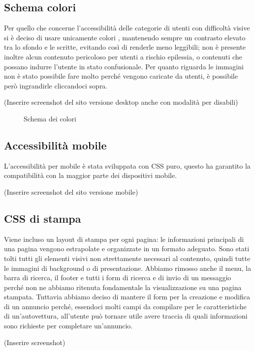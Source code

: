 	\subsection{Schema colori}
	\par Per quello che concerne l’accessibilità delle categorie di utenti con difficoltà visive si è deciso di usare unicamente colori , mantenendo sempre un contrasto elevato tra lo sfondo e le scritte, evitando così di renderle meno leggibili; non è presente inoltre alcun contenuto pericoloso per utenti a rischio epilessia, o contenuti che possano indurre l’utente in stato confusionale. 
Per quanto riguarda le immagini non è stato possibile fare molto perché vengono caricate da utenti, è possibile però ingrandirle cliccandoci sopra.
	\par(Inserire screenshot del sito versione desktop anche con modalità per disabili)
	\begin{figure}[!htb]
		\caption{\label{fig:ganttAnalisi} Schema dei colori}
	\end{figure}
	\subsection{Accessibilità mobile}
	\par L’accessibilità per mobile è stata sviluppata con CSS puro, questo ha garantito la compatibilità con la maggior parte dei dispositivi mobile.
	\par(Inserire screenshot del sito versione mobile)
	\subsection{CSS di stampa}
  \par Viene incluso un layout di stampa per ogni pagina: le informazioni principali di una pagina vengono estrapolate e organizzate in un formato adeguato. Sono stati tolti tutti gli elementi visivi non strettamente necessari al contenuto, quindi tutte le immagini di background o di presentazione. Abbiamo rimosso anche il menu, la barra di ricerca, il footer e tutti i form di ricerca e di invio di un messaggio perch\'e non ne abbiamo ritenuta fondamentale la visualizzazione su una pagina stampata. Tuttavia abbiamo deciso di mantere il form per la creazione e modifica di un annuncio perch\'e, essendoci molti campi da compilare per le caratteristiche di un'autovettura, all'utente pu\`o tornare utile avere traccia di quali informazioni sono richieste per completare un'annuncio.
  
  \par (Inserire screenshot)
	

